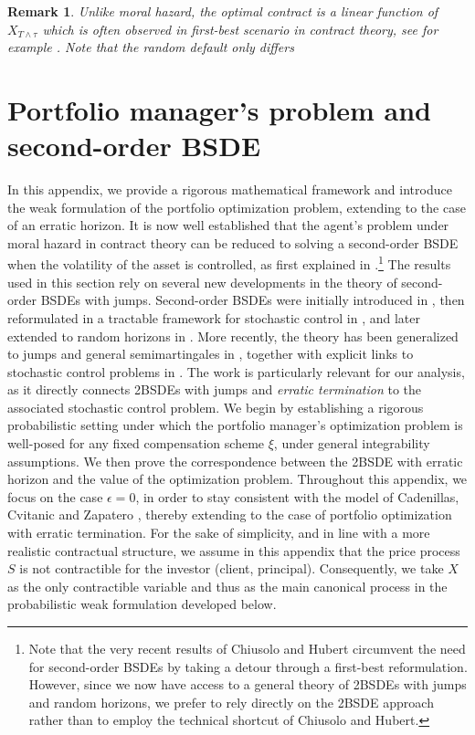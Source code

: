 \documentclass[11pt,a4paper]{article}
\theoremstyle{thmstyleone}%
\theoremstyle{thmstyletwo}%
\newtheorem{remark}{Remark}%
\theoremstyle{thmstylethree}%
\begin{document}
\begin{remark}
    Unlike moral hazard, the optimal contract is a linear function of $X_{T\wedge \tau}$ which is often observed in first-best scenario in contract theory, see for example \cite{mastrolia2018moral}. Note that the random default only differs 
\end{remark}

\section{Portfolio manager's problem and second-order BSDE}
\label{app:2bsdecontract}

In this appendix, we provide a rigorous mathematical framework and introduce the weak formulation of the portfolio optimization problem, extending \cite{cvitanic2017moral,cvitanic2018dynamic} to the case of an erratic horizon. It is now well established that the agent's problem under moral hazard in contract theory can be reduced to solving a second-order BSDE when the volatility of the asset is controlled, as first explained in \cite{cvitanic2018dynamic}.\footnote{Note that the very recent results of Chiusolo and Hubert \cite{chiusolo2024new} circumvent the need for second-order BSDEs by taking a detour through a first-best reformulation. However, since we now have access to a general theory of 2BSDEs with jumps and random horizons, we prefer to rely directly on the 2BSDE approach rather than to employ the technical shortcut of Chiusolo and Hubert.}
The results used in this section rely on several new developments in the theory of second-order BSDEs with jumps. Second-order BSDEs were initially introduced in \cite{cheridito2007second,soner2012wellposedness}, then reformulated in a tractable framework for stochastic control in \cite{possamai2018stochastic}, and later extended to random horizons in \cite{lin2020second,lin2022random,gennaro20252bsde}. More recently, the theory has been generalized to jumps and general semimartingales in \cite{denis2024second,possamai2018stochastic}, together with explicit links to stochastic control problems in \cite{mastrolia2025agency}. The work \cite{gennaro20252bsde} is particularly relevant for our analysis, as it directly connects 2BSDEs with jumps and \emph{erratic termination} to the associated stochastic control problem.
We begin by establishing a rigorous probabilistic setting under which the portfolio manager’s optimization problem is well-posed for any fixed compensation scheme $\xi$, under general integrability assumptions. We then prove the correspondence between the 2BSDE with erratic horizon and the value of the optimization problem. Throughout this appendix, we focus on the case $\epsilon = 0$, in order to stay consistent with the model of Cadenillas, Cvitanic and Zapatero \cite{cadenillas2007optimal}, thereby extending \cite[Section~6.3]{cvitanic2018dynamic} to the case of portfolio optimization with erratic termination.
For the sake of simplicity, and in line with a more realistic contractual structure, we assume in this appendix that the price process $S$ is not contractible for the investor (client, principal). Consequently, we take $X$ as the only contractible variable and thus as the main canonical process in the probabilistic weak formulation developed below.
\end{document}

